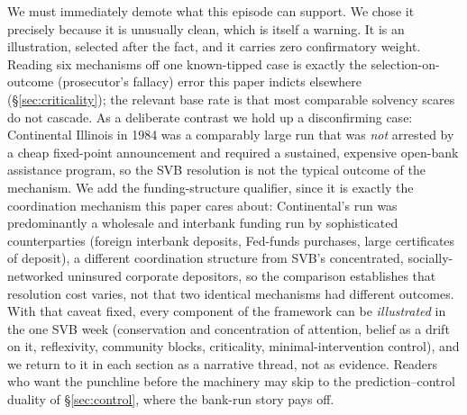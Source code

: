 \documentclass[11pt]{article}
\begin{document}
We must immediately demote what this episode can support. We chose it precisely because it is unusually clean, which is itself a warning. It is an illustration, selected after the fact, and it carries zero confirmatory weight. Reading six mechanisms off one known-tipped case is exactly the selection-on-outcome (prosecutor's fallacy) error this paper indicts elsewhere (\S\ref{sec:criticality}); the relevant base rate is that most comparable solvency scares do not cascade. As a deliberate contrast we hold up a disconfirming case: Continental Illinois in 1984 was a comparably large run that was \emph{not} arrested by a cheap fixed-point announcement and required a sustained, expensive open-bank assistance program, so the SVB resolution is not the typical outcome of the mechanism. We add the funding-structure qualifier, since it is exactly the coordination mechanism this paper cares about: Continental's run was predominantly a wholesale and interbank funding run by sophisticated counterparties (foreign interbank deposits, Fed-funds purchases, large certificates of deposit), a different coordination structure from SVB's concentrated, socially-networked uninsured corporate depositors, so the comparison establishes that resolution cost varies, not that two identical mechanisms had different outcomes. With that caveat fixed, every component of the framework can be \emph{illustrated} in the one SVB week (conservation and concentration of attention, belief as a drift on it, reflexivity, community blocks, criticality, minimal-intervention control), and we return to it in each section as a narrative thread, not as evidence. Readers who want the punchline before the machinery may skip to the prediction--control duality of \S\ref{sec:control}, where the bank-run story pays off.
\end{document}
